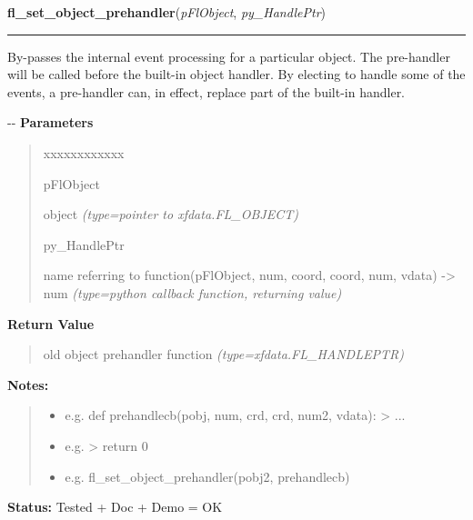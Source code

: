 \hspace{.8\funcindent}\begin{boxedminipage}{\funcwidth}

    \raggedright \textbf{fl\_set\_object\_prehandler}(\textit{pFlObject}, \textit{py\_HandlePtr})

    \vspace{-1.5ex}

    \rule{\textwidth}{0.5\fboxrule}
\setlength{\parskip}{2ex}

By-passes the internal event processing for a particular object. The
pre-handler will be called before the built-in object handler. By electing
to handle some of the events, a pre-handler can, in effect, replace part
of the built-in handler.

-{}-
\setlength{\parskip}{1ex}
      \textbf{Parameters}
      \vspace{-1ex}

      \begin{quote}
        \begin{Ventry}{xxxxxxxxxxxx}

          \item[pFlObject]


object
            {\it (type=pointer to xfdata.FL\_OBJECT)}

          \item[py\_HandlePtr]


name referring to function(pFlObject, num, coord, coord, num,
vdata) -> num
            {\it (type=python callback function, returning value)}

        \end{Ventry}

      \end{quote}

      \textbf{Return Value}
    \vspace{-1ex}

      \begin{quote}

old object prehandler function
      {\it (type=xfdata.FL\_HANDLEPTR)}

      \end{quote}

\textbf{Notes:}
\begin{quote}
  \begin{itemize}

  \item
    \setlength{\parskip}{0.6ex}

e.g. def prehandlecb(pobj, num, crd, crd, num2, vdata): > ...


  \item 
e.g. > return 0


  \item 
e.g. fl\_set\_object\_prehandler(pobj2, prehandlecb)


\end{itemize}

\end{quote}

\textbf{Status:} 
Tested + Doc + Demo = OK


    \end{boxedminipage}

